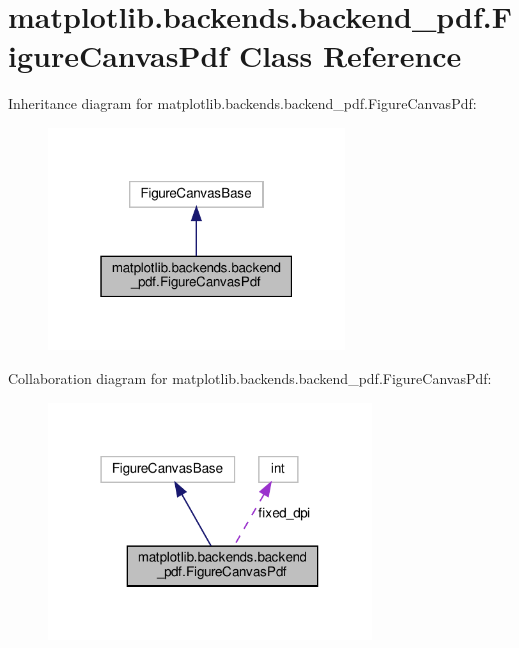 \hypertarget{classmatplotlib_1_1backends_1_1backend__pdf_1_1FigureCanvasPdf}{}\section{matplotlib.\+backends.\+backend\+\_\+pdf.\+Figure\+Canvas\+Pdf Class Reference}
\label{classmatplotlib_1_1backends_1_1backend__pdf_1_1FigureCanvasPdf}


Inheritance diagram for matplotlib.\+backends.\+backend\+\_\+pdf.\+Figure\+Canvas\+Pdf\+:
\nopagebreak
\begin{figure}[H]
\begin{center}
\leavevmode
\includegraphics[width=223pt]{classmatplotlib_1_1backends_1_1backend__pdf_1_1FigureCanvasPdf__inherit__graph}
\end{center}
\end{figure}


Collaboration diagram for matplotlib.\+backends.\+backend\+\_\+pdf.\+Figure\+Canvas\+Pdf\+:
\nopagebreak
\begin{figure}[H]
\begin{center}
\leavevmode
\includegraphics[width=243pt]{classmatplotlib_1_1backends_1_1backend__pdf_1_1FigureCanvasPdf__coll__graph}
\end{center}
\end{figure}
